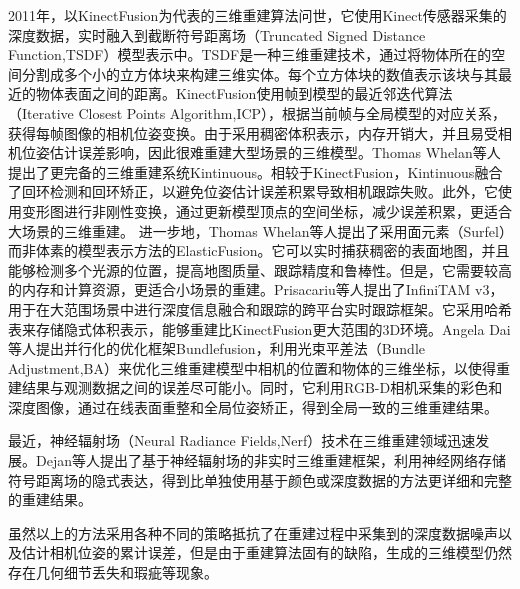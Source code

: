 2011年，以KinectFusion为代表的三维重建算法问世，它使用Kinect传感器采集的深度数据，实时融入到截断符号距离场（Truncated Signed Distance Function,TSDF）模型表示中。TSDF是一种三维重建技术，通过将物体所在的空间分割成多个小的立方体块来构建三维实体。每个立方体块的数值表示该块与其最近的物体表面之间的距离。KinectFusion使用帧到模型的最近邻迭代算法（Iterative Closest Points Algorithm,ICP），根据当前帧与全局模型的对应关系，获得每帧图像的相机位姿变换。由于采用稠密体积表示，内存开销大，并且易受相机位姿估计误差影响，因此很难重建大型场景的三维模型。Thomas Whelan等人提出了更完备的三维重建系统Kintinuous。相较于KinectFusion，Kintinuous融合了回环检测和回环矫正，以避免位姿估计误差积累导致相机跟踪失败。此外，它使用变形图进行非刚性变换，通过更新模型顶点的空间坐标，减少误差积累，更适合大场景的三维重建。
进一步地，Thomas Whelan等人提出了采用面元素（Surfel）而非体素的模型表示方法的ElasticFusion。它可以实时捕获稠密的表面地图，并且能够检测多个光源的位置，提高地图质量、跟踪精度和鲁棒性。但是，它需要较高的内存和计算资源，更适合小场景的重建。Prisacariu等人提出了InfiniTAM v3，用于在大范围场景中进行深度信息融合和跟踪的跨平台实时跟踪框架。它采用哈希表来存储隐式体积表示，能够重建比KinectFusion更大范围的3D环境。Angela Dai等人提出并行化的优化框架Bundlefusion，利用光束平差法（Bundle Adjustment,BA）来优化三维重建模型中相机的位置和物体的三维坐标，以使得重建结果与观测数据之间的误差尽可能小。同时，它利用RGB-D相机采集的彩色和深度图像，通过在线表面重整和全局位姿矫正，得到全局一致的三维重建结果。

最近，神经辐射场（Neural Radiance Fields,Nerf）技术在三维重建领域迅速发展。Dejan等人提出了基于神经辐射场的非实时三维重建框架，利用神经网络存储符号距离场的隐式表达，得到比单独使用基于颜色或深度数据的方法更详细和完整的重建结果。\par

虽然以上的方法采用各种不同的策略抵抗了在重建过程中采集到的深度数据噪声以及估计相机位姿的累计误差，但是由于重建算法固有的缺陷，生成的三维模型仍然存在几何细节丢失和瑕疵等现象。

